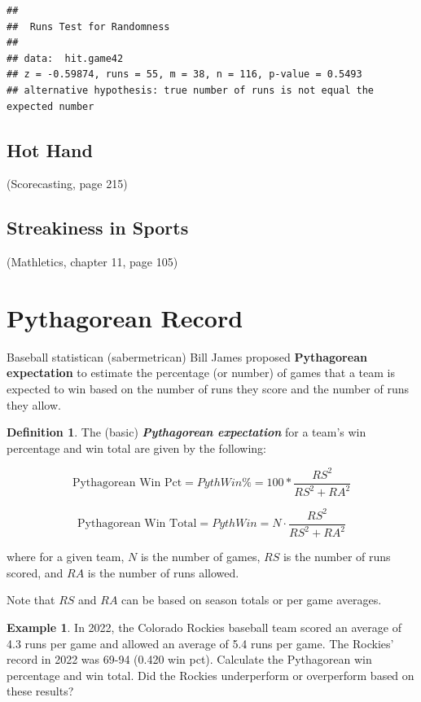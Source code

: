 \documentclass[
  11pt,
]{book}
\theoremstyle{definition}
\newtheorem{definition}{Definition}[chapter]
\theoremstyle{definition}
\newtheorem{example}{Example}[chapter]
\theoremstyle{definition}
\theoremstyle{definition}
\theoremstyle{remark}
\begin{document}
\begin{verbatim}
## 
##  Runs Test for Randomness
## 
## data:  hit.game42
## z = -0.59874, runs = 55, m = 38, n = 116, p-value = 0.5493
## alternative hypothesis: true number of runs is not equal the expected number
\end{verbatim}

\vfill

\newpage

\hypertarget{hot-hand}{%
\subsection{Hot Hand}\label{hot-hand}}

(Scorecasting, page 215)

\hypertarget{streakiness-in-sports}{%
\subsection{Streakiness in Sports}\label{streakiness-in-sports}}

(Mathletics, chapter 11, page 105)

\newpage

\hypertarget{pythagorean-record}{%
\section{Pythagorean Record}\label{pythagorean-record}}

Baseball statistican (sabermetrican) Bill James proposed \textbf{Pythagorean expectation} to estimate the percentage (or number) of games that a team is expected to win based on the number of runs they score and the number of runs they allow.

\begin{definition}
The (basic) \textbf{\emph{Pythagorean expectation}} for a team's win percentage and win total are given by the following:

\[\text{Pythagorean Win Pct} = PythWin\% = 100 * \frac{RS^2}{RS^2 + RA^2}\]

\[\text{Pythagorean Win Total} = PythWin = N \cdot \frac{RS^2}{RS^2 + RA^2}\]

where for a given team, \(N\) is the number of games, \(RS\) is the number of runs scored, and \(RA\) is the number of runs allowed.

Note that \(RS\) and \(RA\) can be based on season totals or per game averages.
\end{definition}

\begin{example}
In 2022, the Colorado Rockies baseball team scored an average of 4.3 runs per game and allowed an average of 5.4 runs per game. The Rockies' record in 2022 was 69-94 (0.420 win pct). Calculate the Pythagorean win percentage and win total. Did the Rockies underperform or overperform based on these results?
\end{example}
\end{document}
